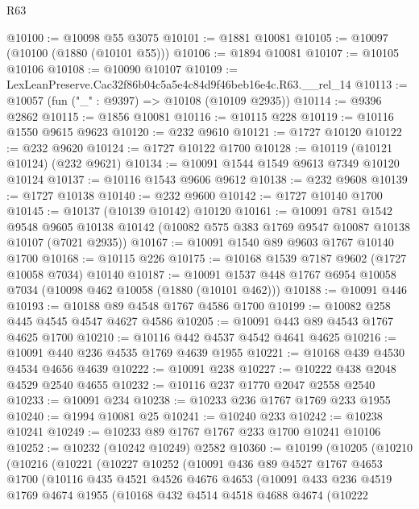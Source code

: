 \begin{lexlean}{R63}
\begin{coremodule}
@10100 := @10098 @55 @3075
@10101 := @1881 @10081
@10105 := @10097 (@10100 (@1880 (@10101 @55)))
@10106 := @1894 @10081
@10107 := @10105 @10106
@10108 := @10090 @10107
@10109 := LexLeanPreserve.Cac32f86b04c5a5e4c84d9f46beb16e4c.R63.__rel_14
@10113 := @10057 (fun ("_" : @9397) => @10108 (@10109 @2935))
@10114 := @9396 @2862
@10115 := @1856 @10081
@10116 := @10115 @228
@10119 := @10116 @1550 @9615 @9623
@10120 := @232 @9610
@10121 := @1727 @10120
@10122 := @232 @9620
@10124 := @1727 @10122 @1700
@10128 := @10119 (@10121 @10124) (@232 @9621)
@10134 := @10091 @1544 @1549 @9613 @7349 @10120 @10124
@10137 := @10116 @1543 @9606 @9612
@10138 := @232 @9608
@10139 := @1727 @10138
@10140 := @232 @9600
@10142 := @1727 @10140 @1700
@10145 := @10137 (@10139 @10142) @10120
@10161 := @10091
    @781
    @1542
    @9548
    @9605
    @10138
    @10142
    (@10082 @575 @383 @1769 @9547 @10087 @10138 @10107 (@7021 @2935))
@10167 := @10091 @1540 @89 @9603 @1767 @10140 @1700
@10168 := @10115 @226
@10175 := @10168 @1539 @7187 @9602 (@1727 @10058 @7034) @10140
@10187 := @10091 @1537 @448 @1767 @6954 @10058 @7034 (@10098 @462 @10058 (@1880 (@10101 @462)))
@10188 := @10091 @446
@10193 := @10188 @89 @4548 @1767 @4586 @1700
@10199 := @10082 @258 @445 @4545 @4547 @4627 @4586
@10205 := @10091 @443 @89 @4543 @1767 @4625 @1700
@10210 := @10116 @442 @4537 @4542 @4641 @4625
@10216 := @10091 @440 @236 @4535 @1769 @4639 @1955
@10221 := @10168 @439 @4530 @4534 @4656 @4639
@10222 := @10091 @238
@10227 := @10222 @438 @2048 @4529 @2540 @4655
@10232 := @10116 @237 @1770 @2047 @2558 @2540
@10233 := @10091 @234
@10238 := @10233 @236 @1767 @1769 @233 @1955
@10240 := @1994 @10081 @25
@10241 := @10240 @233
@10242 := @10238 @10241
@10249 := @10233 @89 @1767 @1767 @233 @1700 @10241 @10106
@10252 := @10232 (@10242 @10249) @2582
@10360 := @10199
    (@10205
      (@10210
        (@10216
          (@10221
            (@10227
              @10252
              (@10091
                @436
                @89
                @4527
                @1767
                @4653
                @1700
                (@10116
                  @435
                  @4521
                  @4526
                  @4676
                  @4653
                  (@10091
                    @433
                    @236
                    @4519
                    @1769
                    @4674
                    @1955
                    (@10168
                      @432
                      @4514
                      @4518
                      @4688
                      @4674
                      (@10222

\end{coremodule}
\end{lexlean}
